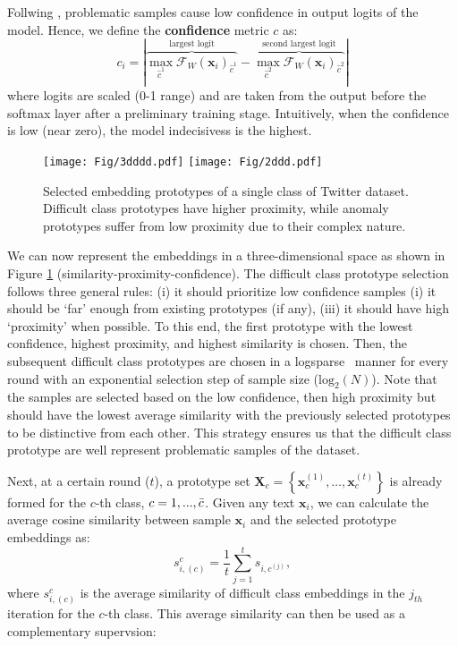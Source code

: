 \documentclass[letterpaper]{article} \usepackage{aaai22}  \usepackage{times}  \usepackage{helvet}  \usepackage{courier}  \usepackage{amsmath,amssymb}
\begin{document}
Follwing \cite{pleiss2020noisyAUM}, problematic samples cause low confidence in output logits of the model. Hence, we define the \textbf{confidence} metric $c$ as:
\begin{equation}
 c_{i} = |\overbrace{\operatorname{max}_{\hat{c}^{1}}{
 \mathcal{F}_{W}(\mathbf{x}_i)_{\hat{c}^{1}}}}^{\text {largest logit}}-\overbrace{\operatorname{max}_{\hat{c}^{2}}
 \mathcal{F}_{W}
 (\mathbf{x}_i)_{\hat{c}^{2}}}
 ^{\text{second largest logit}}|
\end{equation}
where logits are scaled (0-1 range) and are taken from the output before the softmax layer after a preliminary training stage. 
Intuitively, when the confidence is low (near zero), the model indecisivess is the highest.
\begin{figure}[!t]\centering\offinterlineskip
{{\texttt{[image: Fig/3dddd.pdf]}}}\qquad
 {{\texttt{[image: Fig/2ddd.pdf]} }}\caption{Selected embedding prototypes of a single class of Twitter dataset. Difficult class prototypes have higher proximity, while anomaly prototypes suffer from low proximity due to their complex nature.}\label{fig:protype_selection}
\end{figure}

We can now represent the embeddings in a three-dimensional space as shown in Figure \ref{fig:protype_selection} (similarity-proximity-confidence). 
The difficult class prototype selection follows three general rules: (i) it should prioritize low confidence samples (i) it should be `far' enough from existing prototypes (if any), (iii) it should have high `proximity' when possible. 
To this end, the first prototype with the lowest confidence, highest proximity, and highest similarity is chosen. Then, the subsequent difficult class prototypes are chosen in a logsparse~\cite{li2019enhancing} manner for every round with an exponential selection step of sample size ($\text{log}_{2}(N)$). 
Note that the samples are selected based on the low confidence, then high proximity but should have the lowest average similarity with the previously selected prototypes to be distinctive from each other. This strategy ensures us that the difficult class prototype are well represent problematic samples of the dataset.


Next, at a certain round ($t$), a prototype set $\mathbf{X}_{c}=\left\{\mathbf{x}_{c}^{(1)}, \ldots, \mathbf{x}_{c}^{(t)}\right\}$ is already formed for the $c$-th class, $c = 1,...,\Bar{c}$. Given any text $\mathbf{x}_i$, we can calculate the average cosine similarity between sample $\mathbf{x}_i$ and the selected prototype embeddings as:
\begin{equation} \label{eq:similar}
 s^{c}_{i,(c)}=\frac{1}{t} \sum_{j=1}^{t} s_{i,c^{(j)}},
\end{equation}
where $s^{c}_{i,(c)}$ is the average similarity of difficult class embeddings in the $j_{th}$ iteration for the $c$-th class. This average similarity can then be used as a complementary supervsion:
\end{document}
